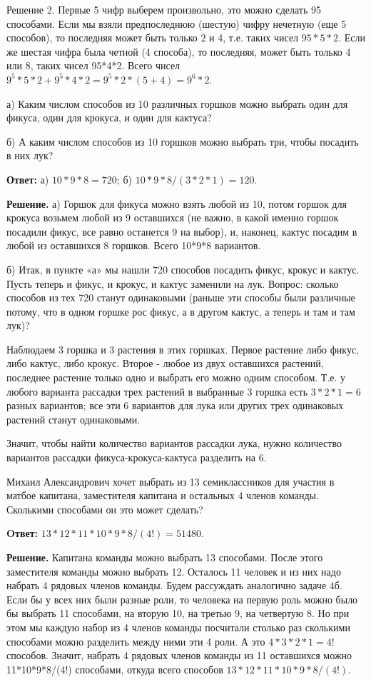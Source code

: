 Решение 2. Первые 5 чифр выберем произвольно, это можно сделать 95 способами. Если мы взяли предпоследнюю (шестую) чифру нечетную (еще 5 способов), то последняя может быть только 2 и 4, т.е. таких чисел $95 * 5 * 2$. Если же шестая чифра была четной (4 способа), то последняя, может быть только 4 или 8, таких чисел 95*4*2. Всего чисел $9^5 * 5 * 2+9^5 * 4 * 2=9^5 * 2 *(5+4)=9^6 * 2$.



а) Каким числом способов из 10 различных горшков можно выбрать один для фикуса, один для крокуса, и один для кактуса?

\noindent
б) А каким числом способов из 10 горшков можно выбрать три, чтобы посадить в них лук?

\textbf{Ответ:} а) $10 * 9 * 8=720$; б) $10 * 9 * 8 /(3 * 2 * 1)=120$.

\textbf{Решение.} 
а) Горшок для фикуса можно взять любой из
10, потом горшок для крокуса возьмем любой из 9 оставшихся (не важно, в какой именно горшок посадили фикус, все равно останется 9 на выбор), и, наконец, кактус посадим в любой из оставшихся 8 горшков. Всего 10*9*8 вариантов.

\noindent
б) Итак, в пункте «а» мы нашли 720 способов посадить фикус, крокус и кактус. Пусть теперь и фикус, и крокус, и кактус заменили на лук. Вопрос: сколько способов из тех 720 станут одинаковыми (раньше эти способы были различные потому, что в одном горшке рос фикус, а в другом кактус, а теперь и там и там лук)?

Наблюдаем 3 горшка и 3 растения в этих горшках. Первое растение либо фикус, либо кактус, либо крокус. Второе - любое из двух оставшихся растений, последнее растение только одно и выбрать его можно одним способом. Т.е. у любого варианта рассадки трех растений в выбранные 3 горшка есть $3 * 2 * 1=6$ разных вариантов; все эти 6 вариантов для лука или других трех одинаковых растений станут одинаковыми.

Значит, чтобы найти количество вариантов рассадки лука, нужно количество вариантов рассадки фикуса-крокуса-кактуса разделить на 6.

Михаил Александрович хочет выбрать из 13 семиклассников для участия в матбое капитана, заместителя капитана и остальных 4 членов команды. Сколькими способами он это может сделать?



\textbf{Oтвет:} $13 * 12 * 11 * 10 * 9 * 8 /(4!)=51480$.

\textbf{Решение.} 
Капитана команды можно выбрать 13 способами. После этого заместителя команды можно выбрать 12. Осталось 11 человек и из них надо набрать 4 рядовых членов команды. Будем рассуждать аналогично задаче 4б. Если бы у всех них были разные роли, то человека на первую роль можно было бы выбрать 11 способами, на вторую 10, на третью 9, на четвертую 8. Но при этом мы каждую набор из 4 членов команды посчитали столько раз сколькими способами можно разделить между ними эти 4 роли. А это $4 * 3 * 2 * 1=4!$ способов. Значит, набрать 4 рядовых членов команды из 11 оставшихся можно 11*10*9*8/(4!) способами, откуда всего способов $13 * 12 * 11 * 10 * 9 * 8 /(4!)$.

